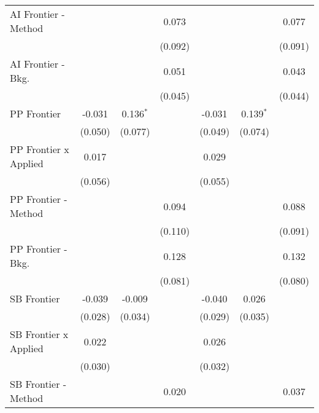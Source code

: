 \begin{tabular}{lcccccc}
   AI Frontier - Method         &               &              & 0.073   &               &             & 0.077\\   
                                &               &              & (0.092) &               &             & (0.091)\\   
   AI Frontier - Bkg.           &               &              & 0.051   &               &             & 0.043\\   
                                &               &              & (0.045) &               &             & (0.044)\\   
   PP Frontier                  & -0.031        & 0.136$^{*}$  &         & -0.031        & 0.139$^{*}$ &   \\   
                                & (0.050)       & (0.077)      &         & (0.049)       & (0.074)     &   \\   
   PP Frontier x Applied        & 0.017         &              &         & 0.029         &             &   \\   
                                & (0.056)       &              &         & (0.055)       &             &   \\   
   PP Frontier - Method         &               &              & 0.094   &               &             & 0.088\\   
                                &               &              & (0.110) &               &             & (0.091)\\   
   PP Frontier - Bkg.           &               &              & 0.128   &               &             & 0.132\\   
                                &               &              & (0.081) &               &             & (0.080)\\   
   SB Frontier                  & -0.039        & -0.009       &         & -0.040        & 0.026       &   \\   
                                & (0.028)       & (0.034)      &         & (0.029)       & (0.035)     &   \\   
   SB Frontier x Applied        & 0.022         &              &         & 0.026         &             &   \\   
                                & (0.030)       &              &         & (0.032)       &             &   \\   
   SB Frontier - Method         &               &              & 0.020   &               &             & 0.037\\   

\end{tabular}
